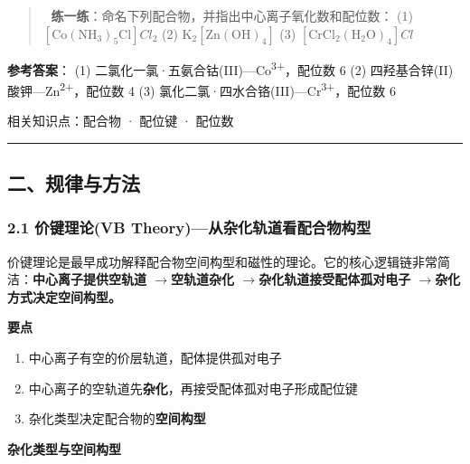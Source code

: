 \documentclass[a4paper,11pt]{ctexart}
\providecommand{\tightlist}{\setlength{\itemsep}{0pt}\setlength{\parskip}{0pt}}
\newcommand{\箭}{\ensuremath{\rightarrow}}
\newcommand{\左箭}{\ensuremath{\leftarrow}}
\newcommand{\上箭}{\ensuremath{\uparrow}}
\newcommand{\下箭}{\ensuremath{\downarrow}}
\newcommand{\衡}{\ensuremath{\rightleftharpoons}}
\newcommand{\双箭}{\ensuremath{\leftrightarrow}}
\newcommand{\约等于}{\ensuremath{\approx}}
\newcommand{\小于等于}{\ensuremath{\leq}}
\newcommand{\大于等于}{\ensuremath{\geq}}
\newcommand{\不等于}{\ensuremath{\neq}}
\newcommand{\西格马}{\ensuremath{\sigma}}
\newcommand{\派}{\ensuremath{\pi}}
\begin{document}
\begin{quote}
📝 \textbf{练一练}：命名下列配合物，并指出中心离子氧化数和配位数：
(1) \([\mathrm{Co(NH_3)_5Cl}]Cl_2\)
(2) \(\mathrm{K_2[Zn(OH)_4]}\)
(3) \([\mathrm{CrCl_2(H_2O)_4}]Cl\)
\end{quote}

\textbf{参考答案}：
(1) 二氯化一氯·五氨合钴(III)---Co\textsuperscript{3+}，配位数 6
(2) 四羟基合锌(II)酸钾---Zn\textsuperscript{2+}，配位数 4
(3) 氯化二氯·四水合铬(III)---Cr\textsuperscript{3+}，配位数 6

相关知识点：配合物 · 配位键 · 配位数

\begin{center}\rule{0.5\linewidth}{0.5pt}\end{center}

\subsection{二、规律与方法}\label{ux4e8cux89c4ux5f8bux4e0eux65b9ux6cd5}

\subsubsection{2.1 价键理论(VB Theory)---从杂化轨道看配合物构型}\label{ux4ef7ux952eux7406ux8bbavb-theoryux4eceux6742ux5316ux8f68ux9053ux770bux914dux5408ux7269ux6784ux578b}

价键理论是最早成功解释配合物空间构型和磁性的理论。它的核心逻辑链非常简洁：\textbf{中心离子提供空轨道 \箭 空轨道杂化 \箭 杂化轨道接受配体孤对电子 \箭 杂化方式决定空间构型。}

\textbf{要点}

\begin{enumerate}
\def\labelenumi{\arabic{enumi}.}
\tightlist
\item
  中心离子有空的价层轨道，配体提供孤对电子
\item
  中心离子的空轨道先\textbf{杂化}，再接受配体孤对电子形成配位键
\item
  杂化类型决定配合物的\textbf{空间构型}
\end{enumerate}

\textbf{杂化类型与空间构型}
\end{document}
